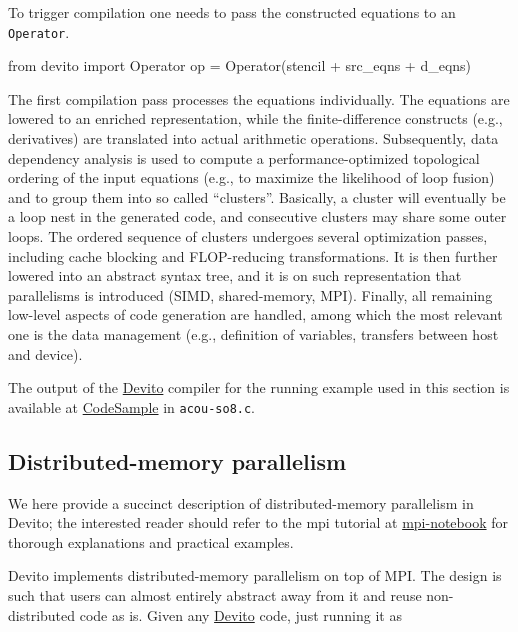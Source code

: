 \documentclass[conference]{IEEEtran}
\newenvironment{Shaded}{}{}
\newcommand{\CharTok}[1]{\textcolor[rgb]{0.25,0.44,0.63}{{#1}}}
\newcommand{\NormalTok}[1]{{#1}}
\begin{document}
To trigger compilation one needs to pass the constructed equations to an
\texttt{Operator}.

\begin{Shaded}
\begin{Highlighting}[]
\CharTok{from} \NormalTok{devito }\CharTok{import} \NormalTok{Operator}
\NormalTok{op = Operator(stencil + src_eqns + d_eqns)}
\end{Highlighting}
\end{Shaded}

The first compilation pass processes the equations individually. The
equations are lowered to an enriched representation, while the
finite-difference constructs (e.g., derivatives) are translated into
actual arithmetic operations. Subsequently, data dependency analysis is
used to compute a performance-optimized topological ordering of the
input equations (e.g., to maximize the likelihood of loop fusion) and to
group them into so called ``clusters''. Basically, a cluster will
eventually be a loop nest in the generated code, and consecutive
clusters may share some outer loops. The ordered sequence of clusters
undergoes several optimization passes, including cache blocking and
FLOP-reducing transformations. It is then further lowered into an
abstract syntax tree, and it is on such representation that parallelisms
is introduced (SIMD, shared-memory, MPI). Finally, all remaining
low-level aspects of code generation are handled, among which the most
relevant one is the data management (e.g., definition of variables,
transfers between host and device).

The output of the \href{https://github.com/devitocodes/devito}{Devito}
compiler for the running example used in this section is available at
\href{https://github.com/mloubout/SC20Paper/tree/master/gencode}{CodeSample}
in \texttt{acou-so8.c}.

\subsection{Distributed-memory
parallelism}\label{distributed-memory-parallelism}

We here provide a succinct description of distributed-memory parallelism
in Devito; the interested reader should refer to the mpi tutorial at
\href{https://github.com/devitocodes/devito/blob/master/examples/mpi/overview.ipynb}{mpi-notebook}
for thorough explanations and practical examples.

Devito implements distributed-memory parallelism on top of MPI. The
design is such that users can almost entirely abstract away from it and
reuse non-distributed code as is. Given any
\href{https://github.com/devitocodes/devito}{Devito} code, just running
it as
\end{document}
